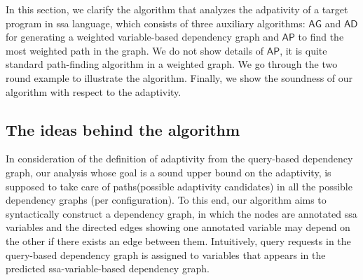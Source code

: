 In this section, we clarify the algorithm {\THESYSTEM} that analyzes the adpativity of a target program in ssa language, which consists of three auxiliary algorithms: $\mathsf{AG}$ and $\mathsf{AD}$ for generating a weighted variable-based dependency graph and $\mathsf{AP}$ to find the most weighted path in the graph. We do not show details of  $\mathsf{AP}$, it is quite standard path-finding algorithm in a weighted graph. We go through the two round example to illustrate the algorithm. Finally, we show the soundness of our algorithm with respect to the adaptivity.  


\subsection{The ideas behind the algorithm}
In consideration of the definition of adaptivity from the query-based dependency graph, our analysis whose goal is a sound upper bound on the adaptivity, is supposed to take care of paths(possible adaptivity candidates) in all the possible dependency graphs (per configuration). To this end, our algorithm aims to syntactically construct a dependency graph, in which the nodes are annotated ssa variables and the directed edges showing one annotated variable may depend on the other if there exists an edge between them. Intuitively, query requests in the query-based dependency graph is assigned to  variables that appears in the  predicted ssa-variable-based dependency graph. 


